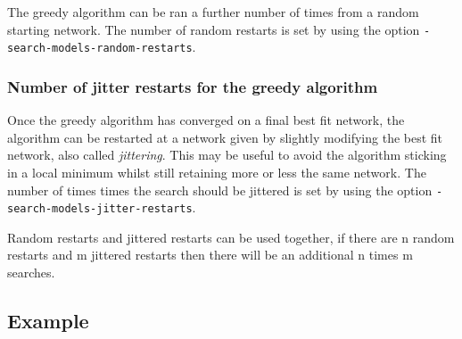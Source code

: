 \documentclass[a4paper,12pt]{article}
\newcommand{\code}[1]{{\footnotesize{{\tt #1}}}}
\begin{document}
The greedy algorithm can be ran a further number of times from a random starting network. The number of random restarts is set by using the option \code{-search-models-random-restarts}. 


\subsubsection{Number of jitter restarts for the greedy algorithm}
\label{search-models-greedy-jitter}

Once the greedy algorithm has converged on a final best fit network, the algorithm can be restarted at a network given by slightly modifying the best fit network, also called {\it jittering}. This may be useful to avoid the algorithm sticking in a local minimum whilst still retaining more or less the same network. The number of times times the search should be jittered is set by using the option \code{-search-models-jitter-restarts}. 

Random restarts and jittered restarts can be used together, if there are n random restarts and m jittered restarts then there will be an additional n times m searches. 




\subsection{Example}
\label{search-models-example}
\end{document}
